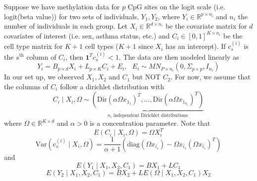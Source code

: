 \documentclass{article}
\begin{document}
Suppose we have methylation data for $p$ CpG sites on the logit scale (i.e. logit(beta value)) for two sets of individuals, $Y_1, Y_2$, where $Y_i \in \mathbb{R}^{p \times n_i}$ and $n_i$ the number of individuals in each group. Let $X_i \in \mathbb{R}^{d \times n_i}$ be the covariate matrix for $d$ covariates of interest (i.e. sex, asthma status, etc.) and $C_i \in [0,1]^{K \times n_i}$ be the cell type matrix for $K+1$ cell types ($K+1$ since $X_i$ has an intercept). If $c_s^{(i)}$ is the $s^{\text{th}}$ column of $C_i$, then $\bm{1}^T c_s^{(i)} < 1$. The data are then modeled linearly as
\[
Y_i = B_{p \times d} X_i + L_{p \times K} C_i + E_i, \text{ } E_i \sim MN_{P \times n_i}\left( 0, \Sigma_{p \times p}, I_{n_i} \right)
\]
In our set up, we observed $X_1, X_2$ and $C_1$ but NOT $C_2$. For now, we assume that the columns of $C_i$ follow a dirichlet distribution with
\[
C_i \mid X_i, \Omega \sim \underbrace{\left( \text{Dir}\left( \alpha\Omega x_{1_1} \right)^T, \ldots, \text{Dir}\left( \alpha\Omega x_{1_{n_i}} \right)^T \right)}_{\text{$n_i$ independent Dirichlet distributions}}
\]
where $\Omega \in \mathbb{R}^{K \times d}$ and $\alpha > 0$ is a concentration parameter. Note that
\[
E\left( C_i \mid X_i, \Omega \right) = \Omega X_i^T
\]
\[
\text{Var}\left( c_s^{(i)} \mid X_i, \Omega \right) = \frac{1}{\alpha + 1}\left( \text{diag}\left( \Omega x_{i_s} \right) - \Omega x_{i_s} \left( \Omega x_{i_s} \right)^T \right)
\]
and
\[
E\left( Y_1 \mid X_1, X_2, C_1 \right) = BX_1 + LC_1
\]
\[
E\left(  Y_2 \mid X_1, X_2, C_1 \right) = BX_2 + LE\left( \Omega \mid X_1, X_2, C_1 \right) X_2
\]
\end{document}
